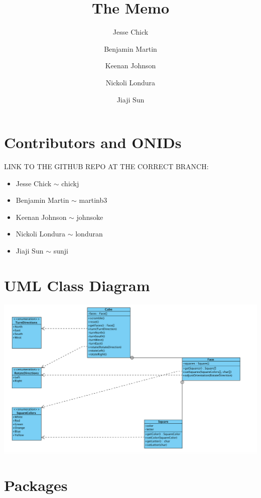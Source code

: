 \documentclass[12pt]{article}
\title{The Memo}
\author{Jesse Chick\\
\and Benjamin Martin\\
\and Keenan Johnson\\
\and Nickoli Londura\\
\and Jiaji Sun}
\begin{document}
\maketitle
\tableofcontents

\section{Contributors and ONIDs}
\par
LINK TO THE GITHUB REPO AT THE CORRECT BRANCH: 

\begin{itemize}
	\item Jesse Chick $\sim$ chickj
	\item Benjamin Martin $\sim$ martinb3
	\item Keenan Johnson $\sim$ johnsoke
	\item Nickoli Londura $\sim$ londuran
	\item Jiaji Sun $\sim$ sunji
\end{itemize}

\section{UML Class Diagram}
	
	\includegraphics[width = \textwidth]{diagram.PNG}

\section{Packages}
\end{document}
